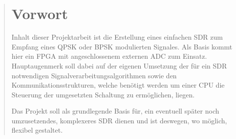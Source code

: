 \begin{quote}

	\section*{Vorwort}
	Inhalt dieser Projektarbeit ist die Erstellung eines einfachen \acl{SDR} zum Empfang eines \acs{QPSK} oder \acs{BPSK} modulierten Signales.
	Als Basis kommt hier ein \acl{FPGA} mit angeschlossenem externen \acl{ADC} zum Einsatz.\\
	
	Hauptaugenmerk soll dabei auf der eigenen Umsetzung der für ein \acs{SDR} notwendigen Signalverarbeitungsalgorithmen sowie den Kommunikationsstrukturen, welche
	benötigt werden um einer \acl{CPU} die Steuerung der umgesetzten Schaltung zu ermöglichen, liegen.

	Das Projekt soll als grundlegende Basis für, ein eventuell später noch umzusetzendes, komplexeres \acs{SDR} dienen und ist deswegen, wo möglich,
	flexibel gestaltet.

\end{quote}
